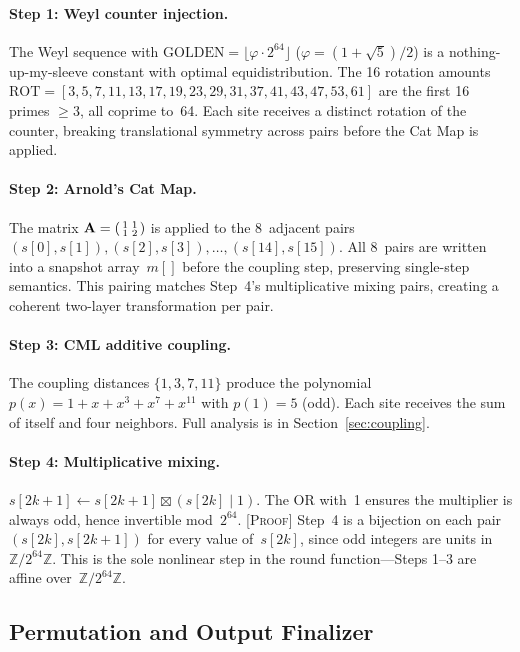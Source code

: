 \documentclass[runningheads]{llncs}
\newcommand{\proof}[1]{\textsc{[Proof]} #1}
\newcommand{\Ztwo}{\mathbb{Z}/2^{64}\mathbb{Z}}
\newcommand{\catmap}{\mathbf{A}}
\begin{document}
\paragraph{Step 1: Weyl counter injection.}
The Weyl sequence with $\mathrm{GOLDEN} = \lfloor \varphi \cdot 2^{64} \rfloor$
($\varphi = (1+\sqrt{5})/2$) is a nothing-up-my-sleeve constant with optimal
equidistribution.  The 16 rotation amounts $\mathrm{ROT} = [3, 5, 7, 11, 13, 17,
19, 23, 29, 31, 37, 41, 43, 47, 53, 61]$ are the first 16 primes $\geq 3$,
all coprime to~64.  Each site receives a distinct rotation of the counter,
breaking translational symmetry across pairs before the Cat Map is applied.

\paragraph{Step 2: Arnold's Cat Map.}
The matrix $\catmap = \begin{psmallmatrix}1&1\\1&2\end{psmallmatrix}$
is applied to the 8~adjacent pairs $(s[0],s[1]), (s[2],s[3]), \ldots, (s[14],s[15])$.
All 8~pairs are written into a snapshot array~$m[]$ before the coupling step,
preserving single-step semantics.  This pairing matches Step~4's multiplicative
mixing pairs, creating a coherent two-layer transformation per pair.

\paragraph{Step 3: CML additive coupling.}
The coupling distances $\{1, 3, 7, 11\}$ produce the polynomial
$p(x) = 1 + x + x^3 + x^7 + x^{11}$ with $p(1) = 5$ (odd).
Each site receives the sum of itself and four neighbors.
Full analysis is in Section~\ref{sec:coupling}.

\paragraph{Step 4: Multiplicative mixing.}
$s[2k+1] \gets s[2k+1] \boxtimes (s[2k] \mathbin{|} 1)$.
The OR with~1 ensures the multiplier is always odd, hence invertible
mod~$2^{64}$.
\proof{Step~4 is a bijection on each pair $(s[2k], s[2k+1])$ for every value of~$s[2k]$,
since odd integers are units in~$\Ztwo$.}
This is the sole nonlinear step in the round function---Steps 1--3 are affine
over~$\Ztwo$.

\subsection{Permutation and Output Finalizer}
\end{document}
